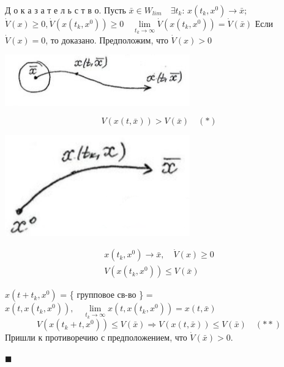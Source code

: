 \documentclass[oneside, final, 12pt]{article}
\theoremstyle{def}
\theoremstyle{th}
\theoremstyle{rem}
\renewenvironment{proof}{\par Д о к а з а т е л ь с т в о.}{\hfill$\blacksquare$}
\numberwithin{figure}{section}
\numberwithin{equation}{section}
\begin{document}
	\begin{proof} \newline
		Пусть $\bar{x} \in W_{lim}\quad \exists t_k: \, x(t_k,x^0) \rightarrow \bar{x}$;
		$\dot{V}(x) \geqslant 0 , \dot{V}(x(t_k, x^0))\geqslant 0 \quad \lim\limits_{t_k\rightarrow \infty}
																\dot{V}(x(t_k, x^0)) = \dot{V}(\bar{x}) $ \newline
		Если $\dot{V}(x) = 0$, то доказано. \newline
		Предположим, что $\dot{V}(x) > 0$\newline
		\begin{minipage}{0.4\textwidth} \vspace{3mm}		
			\begin{center} \includegraphics[width=0.6\textwidth]{pict/pict_13_1.png} \vspace{5mm}\end{center} 
		\end{minipage} 
		\begin{minipage}{0.4\textwidth}	
			$$V(x(t,\bar{x})) > V(\bar{x})\quad (*)$$
		\end{minipage} 	
		\newline
		\begin{minipage}{0.4\textwidth} \vspace{3mm}		
			\begin{center} \includegraphics[width=0.6\textwidth]{pict/pict_13_2.png} \vspace{5mm}\end{center} 
		\end{minipage} 
		\begin{minipage}{0.4\textwidth}	
			$$\begin{gathered}  x(t_k,x^0) \rightarrow \bar{x}, \quad \dot{V}(x)\geqslant 0 \\
												 V(x(t_k, x^0)) \leqslant V(\bar{x}) \end{gathered}$$
		\end{minipage} \newline	
		$x(t+t_k,x^0)$ = \{ групповое св-во \} = $x(t, x(t_k,x^0)), \quad 
										\lim\limits_{t_k\rightarrow \infty} x(t,x(t_k,x^0)) = x(t,\bar{x})$
		$$
			V(x(t_k+t,x^0)) \leqslant V(\bar{x}) \Rightarrow V(x(t,\bar{x})) \leqslant V(\bar{x}) \quad (**)
		$$
		Пришли к противоречию с предположением, что $\dot{V}(\bar{x})>0$.
		
	\end{proof}
	
\end{document}
